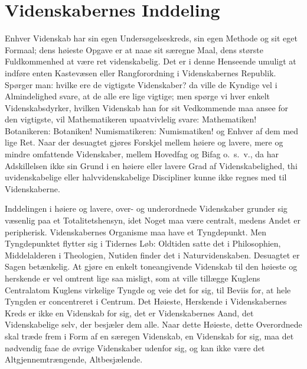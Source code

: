 \documentclass[12pt]{book}
\newcommand{\apage}[1]{\marginnote{\footnotesize\textit{[#1]}}}
\begin{document}
\section{Videnskabernes Inddeling}
\label{sec:10}

\noindent Enhver Videnskab har sin egen Undersøgelseskreds, sin egen
Methode og sit eget Formaal; dens høieste Opgave er at naae sit særegne
Maal, dens største Fuldkommenhed at være ret videnskabelig. Det er i denne
Henseende umuligt at indføre enten Kastevæsen eller Rangforordning i
Videnskabernes Republik. Spørger man: hvilke ere de vigtigste Videnskaber?
da ville de Kyndige vel i Almindelighed svare, at de alle ere lige
vigtige; men spørge vi hver enkelt Videnskabsdyrker, hvilken Videnskab han
for sit Vedkommende maa ansee for den vigtigste, vil Mathematikeren
upaatvivlelig svare: Mathematiken! Botanikeren: Botaniken! Numismatikeren:
Numismatiken! og Enhver af dem med lige Ret. Naar der desuagtet gjøres
Forskjel mellem høiere og lavere, mere og mindre omfattende Videnskaber,
mellem Hovedfag og Bifag o.\ s.\ v., da har Adskillelsen ikke sin Grund i en
høiere eller lavere Grad af Videnskabelighed, thi uvidenskabelige eller
halvvidenskabelige Discipliner kunne ikke regnes med til Videnskaberne.

Inddelingen i høiere og lavere, over- og underordnede Videnskaber grunder
sig væsenlig paa et Totalitetshensyn, idet Noget maa være centralt, medens
Andet er peripherisk. Videnskabernes Organisme maa have et Tyngdepunkt.
Men Tyngdepunktet flytter sig i Tidernes Løb: Oldtiden satte det i
Philosophien,  \apage{91} Middelalderen i Theologien, Nutiden finder det i
Naturvidenskaben. Desuagtet er Sagen betænkelig. At gjøre en enkelt
toneangivende Videnskab til den høieste og herskende er vel omtrent lige
saa misligt, som at ville tillægge Kuglens Centralatom Kuglens virkelige
Tyngde og veie det for sig, til Beviis for, at hele Tyngden er concentreret
i Centrum. Det Høieste, Herskende i Videnskabernes Kreds er ikke en
Videnskab for sig, det er Videnskabernes Aand, det Videnskabelige selv, der
besjæler dem alle. Naar dette Høieste, dette Overordnede skal træde frem i
Form af en særegen Videnskab, en Videnskab for sig, maa det nødvendig faae
de øvrige Videnskaber udenfor sig, og kan ikke være det Altgjennemtrængende,
Altbesjælende.
\end{document}
